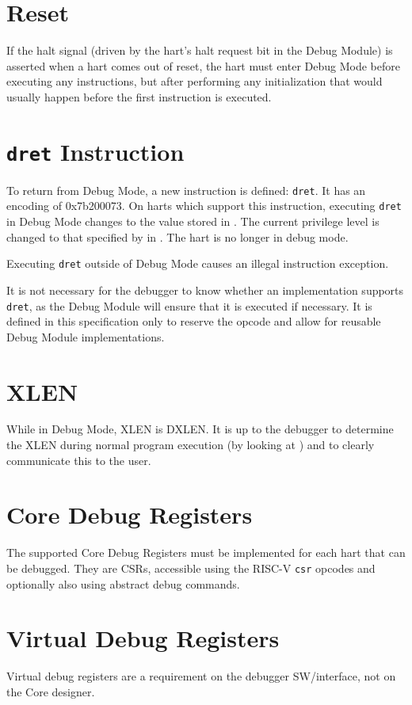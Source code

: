 \section{Reset}

If the halt signal (driven by the hart's halt request bit in the Debug Module)
is asserted when a hart comes out of reset, the hart must
enter Debug Mode before executing any instructions, but after performing any
initialization that would usually happen before the first instruction is
executed.

\section{{\tt dret} Instruction} \label{dret}

To return from Debug Mode, a new instruction is defined: {\tt dret}. It has an
encoding of 0x7b200073. On harts which support this instruction,
executing {\tt dret} in Debug Mode changes \Rpc to the value
stored in \Rdpc. The current privilege level is changed to that specified by
\Fprv in \Rdcsr. The hart is no longer in debug mode.

Executing {\tt dret} outside of Debug Mode causes an illegal instruction exception.

It is not necessary for the debugger to know whether an implementation supports
{\tt dret}, as the Debug Module will ensure that it is executed if necessary.
It is defined in this specification only to reserve the opcode and
allow for reusable Debug Module implementations.

\section{XLEN}

While in Debug Mode, XLEN is DXLEN. It is up to the debugger to determine the
XLEN during normal program execution (by looking at \Rmisa) and to clearly
communicate this to the user.

\section{Core Debug Registers} \label{debreg}

The supported Core Debug Registers must be implemented for each hart that can
be debugged. They are CSRs, accessible using the RISC-V {\tt csr} opcodes and
optionally also using abstract debug commands.



\section{Virtual Debug Registers} \label{virtreg}

Virtual debug registers are a requirement on the debugger SW/interface,
not on the Core designer.


